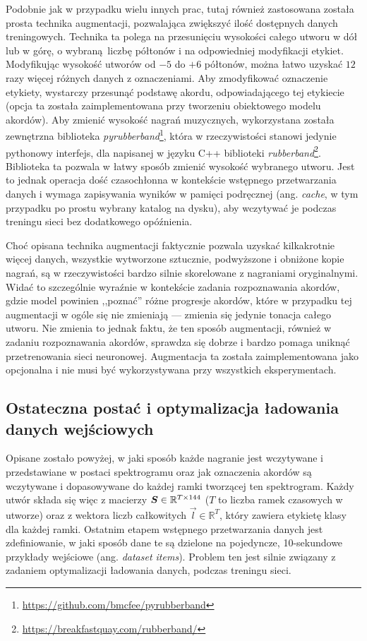 Podobnie jak w przypadku wielu innych prac, tutaj również zastosowana została prosta technika augmentacji, pozwalająca zwiększyć ilość dostępnych danych treningowych. Technika ta polega na przesunięciu wysokości całego utworu w dół lub w górę, o wybraną liczbę półtonów i na odpowiedniej modyfikacji etykiet. Modyfikując wysokość utworów od $-5$ do $+6$ półtonów, można łatwo uzyskać $12$ razy więcej różnych danych z oznaczeniami. Aby zmodyfikować oznaczenie etykiety, wystarczy przesunąć podstawę akordu, odpowiadającego tej etykiecie (opcja ta została zaimplementowana przy tworzeniu obiektowego modelu akordów). Aby zmienić wysokość nagrań muzycznych, wykorzystana została zewnętrzna biblioteka \emph{pyrubberband}\footnote{\url{https://github.com/bmcfee/pyrubberband}}, która w rzeczywistości stanowi jedynie pythonowy interfejs, dla napisanej w języku C++ biblioteki \emph{rubberband}\footnote{\url{https://breakfastquay.com/rubberband/}}. Biblioteka ta pozwala w łatwy sposób zmienić wysokość wybranego utworu. Jest to jednak operacja dość czasochłonna w kontekście wstępnego przetwarzania danych i wymaga zapisywania wyników w pamięci podręcznej (ang. \emph{cache}, w tym przypadku po prostu wybrany katalog na dysku), aby wczytywać je podczas treningu sieci bez dodatkowego opóźnienia.

Choć opisana technika augmentacji faktycznie pozwala uzyskać kilkakrotnie więcej danych, wszystkie wytworzone sztucznie, podwyższone i obniżone kopie nagrań, są w rzeczywistości bardzo silnie skorelowane z nagraniami oryginalnymi. Widać to szczególnie wyraźnie w kontekście zadania rozpoznawania akordów, gdzie model powinien ,,poznać'' różne progresje akordów, które w przypadku tej augmentacji w ogóle się nie zmieniają --- zmienia się jedynie tonacja całego utworu. Nie zmienia to jednak faktu, że ten sposób augmentacji, również w zadaniu rozpoznawania akordów, sprawdza się dobrze i bardzo pomaga uniknąć przetrenowania sieci neuronowej. Augmentacja ta została zaimplementowana jako opcjonalna i nie musi być wykorzystywana przy wszystkich eksperymentach.

\subsection{Ostateczna postać i optymalizacja ładowania danych wejściowych}

Opisane zostało powyżej, w jaki sposób każde nagranie jest wczytywane i przedstawiane w postaci spektrogramu oraz jak oznaczenia akordów są wczytywane i dopasowywane do każdej ramki tworzącej ten spektrogram. Każdy utwór składa się więc z macierzy $\boldsymbol{S} \in \mathbb{R}^{T \times 144}$ ($T$ to liczba ramek czasowych w utworze) oraz z wektora liczb całkowitych $\vec l \in \mathbb{R}^T$, który zawiera etykietę klasy dla każdej ramki. Ostatnim etapem wstępnego przetwarzania danych jest zdefiniowanie, w jaki sposób dane te są dzielone na pojedyncze, 10-sekundowe przykłady wejściowe (ang. \emph{dataset items}). Problem ten jest silnie związany z zadaniem optymalizacji ładowania danych, podczas treningu sieci.

